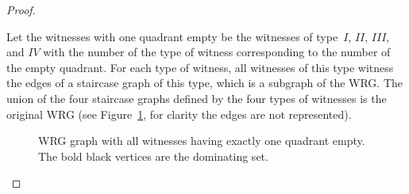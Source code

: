 \documentclass{llncs}
\begin{document}
\begin{proof}
\begin{enumerate}[i)]
Let the witnesses with one quadrant empty be the witnesses of type~$I$, $II$, $III$, and $IV$ with the number of the type of witness corresponding to the number of the empty quadrant. 
For each type of witness, all witnesses of this type witness the edges of a staircase graph of this type, which is a subgraph of the WRG.
The union of the four staircase graphs defined by the four types of witnesses is the original WRG (see Figure~\ref{DominationNumber}, for clarity the edges are not represented).
\begin{figure}
\centering
{}
\caption{WRG graph with all witnesses having exactly one quadrant empty. The bold black vertices are the dominating set.}
\label{DominationNumber}
\end{figure}



\end{enumerate}
\end{proof}
\end{document}
